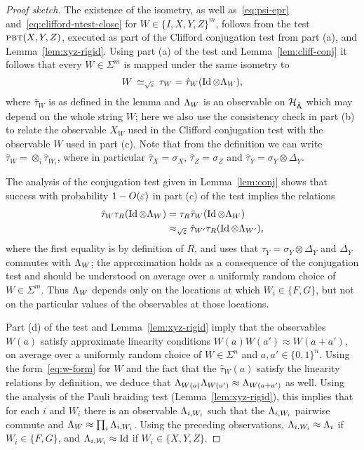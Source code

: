 \begin{proof}[Proof sketch]
The existence of the isometry, as well as~\eqref{eq:psi-epr} and~\eqref{eq:clifford-ntest-close} for $W \in \{I,X,Y,Z\}^{m}$, follows from the test $\textsc{pbt}(X,Y,Z)$, executed as part of the Clifford conjugation test from part (a), and Lemma~\ref{lem:xyz-rigid}. 
Using part (a) of the test and Lemma~\ref{lem:cliff-conj} it follows that every $W \in \Sigma^m$ is mapped under the same isometry to 
\begin{equation}\label{eq:w-form}
W \,\simeq_{\sqrt{\varepsilon}}\, \tau_W = \hat{\tau}_W(\mathop{\rm Id}\nolimits \otimes \Lambda_W),
\end{equation}
 where $\hat{\tau}_W$ is as defined in the lemma  and  $\Lambda_W$ is an observable on $\mathcal{H}_{\hat{{\textsf{A}}}}$ which may depend on the whole string $W$;  here we also use the consistency check in part (b) to relate  the observable $X_W$ used in the Clifford conjugation test with the observable $W$ used in part (c). Note that from the definition we can write $\hat{\tau}_W = \otimes_i \hat{\tau}_{W_i}$, where in particular $\hat{\tau}_X = \sigma_X$, $\hat{\tau}_Z = \sigma_Z$ and $\hat{\tau}_Y = \sigma_Y \otimes \Delta_Y$.

The analysis of the conjugation test given in Lemma~\ref{lem:conj} shows that success with probability $1-O(\varepsilon)$ in part (c) of the test implies the relations 
\begin{align*}
 \hat{\tau}_W \tau_R(\mathop{\rm Id}\nolimits \otimes \Lambda_W)  &= \tau_R \hat{\tau}_W  (\mathop{\rm Id}\nolimits\otimes\Lambda_W) \\
&  \approx_{\sqrt{\varepsilon}} \hat{\tau}_{W'}  \tau_R (\mathop{\rm Id}\nolimits\otimes \Lambda_{W'}),
\end{align*}
where the first equality is by definition of $R$, and uses that $\tau_Y = \sigma_Y \otimes \Delta_Y$ and $\Delta_Y$ commutes with $\Lambda_W$; the approximation holds as a consequence of the conjugation test and should be understood on average over a uniformly random choice of $W\in \Sigma^m$. Thus $\Lambda_W$ depends only on the locations at which $W_i \in \{F,G\}$, but not on the particular values of the observables at those locations.  

Part (d) of the test and Lemma~\ref{lem:xyz-rigid} imply that the observables $W(a)$ satisfy approximate linearity conditions $W(a)W(a')\approx W(a+a')$, on average over a uniformly random choice of $W\in\Sigma^n$ and $a,a'\in\{0,1\}^n$. Using the form~\eqref{eq:w-form} for $W$ and the fact that the $\hat{\tau}_W(a)$ satisfy the linearity relations by definition, we deduce that $\Lambda_{W(a)}\Lambda_{{W(a')}} \approx \Lambda_{W(a+a')}$ as well. Using the analysis of the Pauli braiding test (Lemma~\ref{lem:xyz-rigid}), this implies that for each $i$ and $W_i$ there is an observable $\Lambda_{i,W_i}$ such that the $\Lambda_{i,W_i}$ pairwise commute and $\Lambda_W \approx \prod_i \Lambda_{i,W_i}$. Using the preceding observations, $\Lambda_{i,W_i} \approx \Lambda_i$ if $W_i \in\{F,G\}$, and $\Lambda_{i,W_i} \approx \mathop{\rm Id}\nolimits$ if $W_i \in \{X,Y,Z\}$. 


\end{proof}
